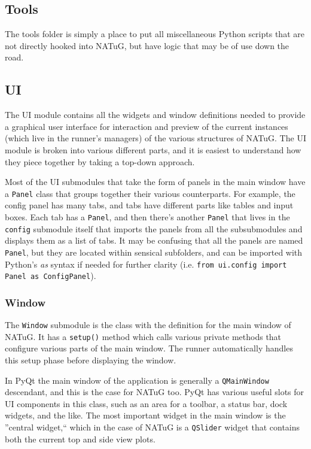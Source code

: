 \documentclass[titlepage]{article}
\begin{document}
	\subsection{Tools}
	The tools folder is simply a place to put all miscellaneous Python scripts that are not directly hooked into NATuG, but have logic that may be of use down the road.
	
	\subsection{UI}
	The UI module contains all the widgets and window definitions needed to provide a graphical user interface for interaction and preview of the current instances (which live in the runner's managers) of the various structures of NATuG. The UI module is broken into various different parts, and it is easiest to understand how they piece together by taking a top-down approach. 
	
	Most of the UI submodules that take the form of panels in the main window have a \texttt{Panel} class that groups together their various counterparts. For example, the config panel has many tabs, and tabs have different parts like tables and input boxes. Each tab has a \texttt{Panel}, and then there's another \texttt{Panel} that lives in the \texttt{config} submodule itself that imports the panels from all the subsubmodules and displays them as a list of tabs. It may be confusing that all the panels are named \texttt{Panel}, but they are located within sensical subfolders, and can be imported with Python's \textit{as} syntax if needed for further clarity (i.e. \texttt{from ui.config import Panel as ConfigPanel}).
	
	\subsubsection{Window}
	The \texttt{Window} submodule is the class with the definition for the main window of NATuG. It has a \texttt{setup()} method which calls various private methods that configure various parts of the main window. The runner automatically handles this setup phase before displaying the window.
	
	In PyQt the main window of the application is generally a \texttt{QMainWindow} descendant, and this is the case for NATuG too. PyQt has various useful slots for UI components in this class, such as an area for a toolbar, a status bar, dock widgets, and the like. The most important widget in the main window is the ''central widget,`` which in the case of NATuG is a \texttt{QSlider} widget that contains both the current top and side view plots.
	
\end{document}
